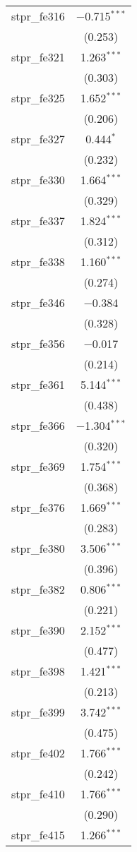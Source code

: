 \begin{table}[!htbp]
\begin{tabular}{@{\extracolsep{5pt}}lc}
  stpr\_fe316 & $-$0.715$^{***}$ \\ 
  & (0.253) \\ 
  stpr\_fe321 & 1.263$^{***}$ \\ 
  & (0.303) \\ 
  stpr\_fe325 & 1.652$^{***}$ \\ 
  & (0.206) \\ 
  stpr\_fe327 & 0.444$^{*}$ \\ 
  & (0.232) \\ 
  stpr\_fe330 & 1.664$^{***}$ \\ 
  & (0.329) \\ 
  stpr\_fe337 & 1.824$^{***}$ \\ 
  & (0.312) \\ 
  stpr\_fe338 & 1.160$^{***}$ \\ 
  & (0.274) \\ 
  stpr\_fe346 & $-$0.384 \\ 
  & (0.328) \\ 
  stpr\_fe356 & $-$0.017 \\ 
  & (0.214) \\ 
  stpr\_fe361 & 5.144$^{***}$ \\ 
  & (0.438) \\ 
  stpr\_fe366 & $-$1.304$^{***}$ \\ 
  & (0.320) \\ 
  stpr\_fe369 & 1.754$^{***}$ \\ 
  & (0.368) \\ 
  stpr\_fe376 & 1.669$^{***}$ \\ 
  & (0.283) \\ 
  stpr\_fe380 & 3.506$^{***}$ \\ 
  & (0.396) \\ 
  stpr\_fe382 & 0.806$^{***}$ \\ 
  & (0.221) \\ 
  stpr\_fe390 & 2.152$^{***}$ \\ 
  & (0.477) \\ 
  stpr\_fe398 & 1.421$^{***}$ \\ 
  & (0.213) \\ 
  stpr\_fe399 & 3.742$^{***}$ \\ 
  & (0.475) \\ 
  stpr\_fe402 & 1.766$^{***}$ \\ 
  & (0.242) \\ 
  stpr\_fe410 & 1.766$^{***}$ \\ 
  & (0.290) \\ 
  stpr\_fe415 & 1.266$^{***}$ \\ 

\end{tabular}
\end{table}
